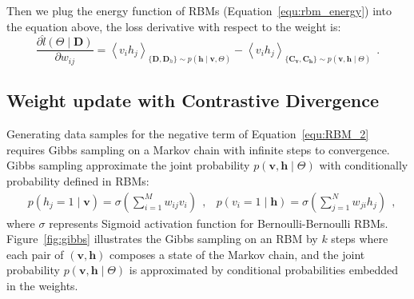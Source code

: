 Then we plug the energy function of RBMs (Equation~\ref{equ:rbm_energy}) into the equation above, the loss derivative with respect to the weight is:
\begin{equation}
\label{equ:RBM_2}
\dfrac{\partial \hat{l} (\Theta \mid \mathbf{D})}{\partial w_{ij}} 
= \left \langle v_i h_j \right \rangle_{\{\mathbf{D}, \mathbf{D}_h\} \sim p( \mathbf{h} \mid \mathbf{v}, \Theta)}
- \left \langle  v_i h_j \right \rangle_{\{\mathbf{C_v}, \mathbf{C_h}\} \sim p( \mathbf{v}, \mathbf{h} \mid  \Theta)}~~. %
\end{equation}
\subsection{Weight update with Contrastive Divergence}
\label{sec:cd}
Generating data samples for the negative term of Equation~\ref{equ:RBM_2} requires Gibbs sampling on a Markov chain with infinite steps to convergence.
Gibbs sampling approximate the joint probability $p( \mathbf{v}, \mathbf{h} \mid  \Theta)$ with conditionally probability defined in RBMs:
\begin{equation}
\begin{aligned}
& p(h_j = 1 \mid \mathbf{v}) = \sigma(\sum_{i=1}^{M} w_{ij} v_i)~~,
& p(v_i = 1 \mid \mathbf{h}) = \sigma(\sum_{j=1}^{N} w_{ji} h_j)~~,
\end{aligned}
\end{equation} 
where $\sigma$ represents Sigmoid activation function for Bernoulli-Bernoulli RBMs.
Figure~\ref{fig:gibbs} illustrates the Gibbs sampling on an RBM by $k$ steps where each pair of $(\mathbf{v}, \mathbf{h})$ composes a state of the Markov chain, and the joint probability $p( \mathbf{v}, \mathbf{h} \mid  \Theta)$ is approximated by conditional probabilities embedded in the weights.

